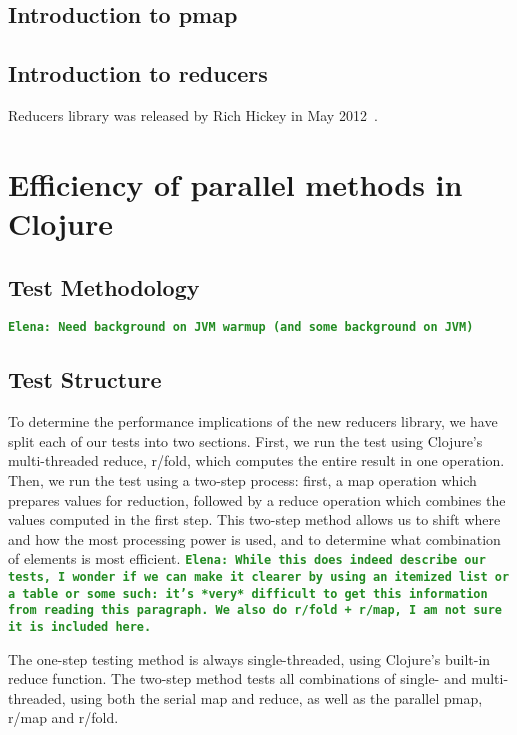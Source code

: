 \documentclass[12pt]{article}
\newcommand{\comment}[1]{{\bf \tt  {#1}}}
\newcommand{\emcomment}[1]{\textcolor{ForestGreen}{\comment{Elena: {#1}}}}
\begin{document}
\subsection{Introduction to pmap}\label{sec:pmap}




\subsection{Introduction to reducers}\label{sec:reducers}
Reducers library was released by Rich Hickey in May 2012~\cite{HickeyReducers}. 

\section{Efficiency of parallel methods in Clojure}\label{sec:efficiency} 

\subsection{Test Methodology}\label{sec:methods}
 
\emcomment{Need background on JVM warmup (and some background on JVM)}

\subsection{Test Structure}\label{sec:testStruct}
To determine the performance implications of the new reducers library, we have split each of our tests into two sections. First, we run the test using Clojure's multi-threaded reduce, r/fold, which computes the entire result in one operation. Then, we run the test using a two-step process: first, a map operation which prepares values for reduction, followed by a reduce operation which combines the values computed in the first step. This two-step method allows us to shift where and how the most processing power is used, and to determine what combination of elements is most efficient.
\emcomment{While this does indeed describe our tests, I wonder if we can make it clearer by using an itemized list or a table or some such: it's *very* difficult to get this information from reading this paragraph. We also do r/fold + r/map, I am not sure it is included here.}

The one-step testing method is always single-threaded, using Clojure's built-in reduce function. The two-step method tests all combinations of single- and multi-threaded, using both the serial map and reduce, as well as the parallel pmap, r/map and r/fold.
\end{document}
